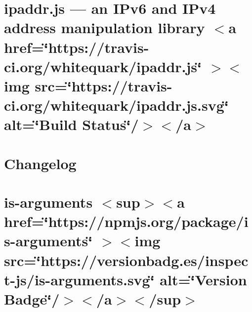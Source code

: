 \documentclass[twoside]{book}
\newcommand{\+}{\discretionary{\mbox{\scriptsize$\hookleftarrow$}}{}{}}
\begin{document}
\chapter{ipaddr.\+js — an IPv6 and IPv4 address manipulation library \texorpdfstring{$<$}{<}a href=\char`\"{}https\+://travis-\/ci.\+org/whitequark/ipaddr.\+js\char`\"{} \texorpdfstring{$>$}{>}\texorpdfstring{$<$}{<}img src=\char`\"{}https\+://travis-\/ci.\+org/whitequark/ipaddr.\+js.\+svg\char`\"{} alt=\char`\"{}\+Build Status\char`\"{}/\texorpdfstring{$>$}{>}\texorpdfstring{$<$}{<}/a\texorpdfstring{$>$}{>}}
\label{md__c___users_vaishnavi_jadhav__desktop__developer_code_mean_stack_example_client_node_modules_ipaddr_js__r_e_a_d_m_e}

\chapter{Changelog}
\label{md__c___users_vaishnavi_jadhav__desktop__developer_code_mean_stack_example_client_node_modules_is_arguments__c_h_a_n_g_e_l_o_g}

\chapter{is-\/arguments \texorpdfstring{$<$}{<}sup\texorpdfstring{$>$}{>}\texorpdfstring{$<$}{<}a href=\char`\"{}https\+://npmjs.\+org/package/is-\/arguments\char`\"{} \texorpdfstring{$>$}{>}\texorpdfstring{$<$}{<}img src=\char`\"{}https\+://versionbadg.\+es/inspect-\/js/is-\/arguments.\+svg\char`\"{} alt=\char`\"{}\+Version Badge\char`\"{}/\texorpdfstring{$>$}{>}\texorpdfstring{$<$}{<}/a\texorpdfstring{$>$}{>}\texorpdfstring{$<$}{<}/sup\texorpdfstring{$>$}{>}}
\label{md__c___users_vaishnavi_jadhav__desktop__developer_code_mean_stack_example_client_node_modules_is_arguments__r_e_a_d_m_e}

\end{document}
